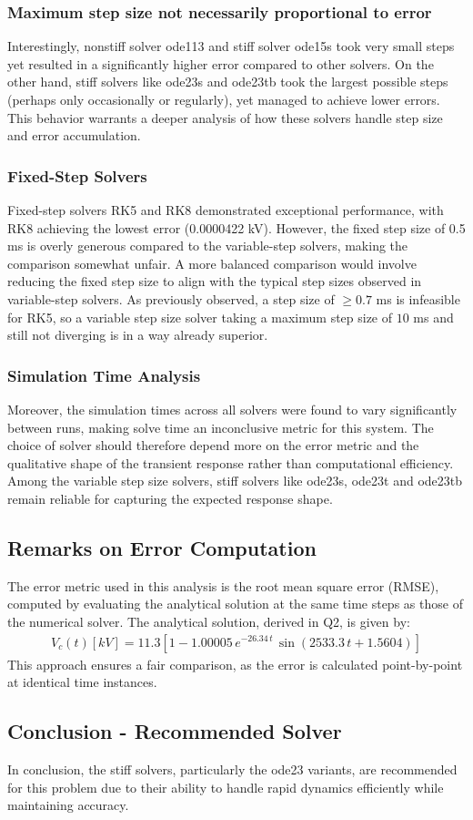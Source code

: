 \subsubsection*{Maximum step size not necessarily proportional to error}
Interestingly, nonstiff solver ode113 and stiff solver ode15s took very small steps yet resulted in a significantly higher error compared to other solvers. On the other hand, stiff solvers like ode23s and ode23tb took the largest possible steps (perhaps only occasionally or regularly), yet managed to achieve lower errors. This behavior warrants a deeper analysis of how these solvers handle step size and error accumulation.

\subsubsection*{Fixed-Step Solvers}
Fixed-step solvers RK5 and RK8 demonstrated exceptional performance, with RK8 achieving the lowest error (0.0000422 kV). However, the fixed step size of 0.5 ms is overly generous compared to the variable-step solvers, making the comparison somewhat unfair. A more balanced comparison would involve reducing the fixed step size to align with the typical step sizes observed in variable-step solvers. As previously observed, a step size of $\geq 0.7$ ms is infeasible for RK5, so a variable step size solver taking a maximum step size of $10$ ms and still not diverging is in a way already superior.

\subsubsection*{Simulation Time Analysis}
Moreover, the simulation times across all solvers were found to vary significantly between runs, making solve time an inconclusive metric for this system. The choice of solver should therefore depend more on the error metric and the qualitative shape of the transient response rather than computational efficiency. Among the variable step size solvers, stiff solvers like ode23s, ode23t and ode23tb remain reliable for capturing the expected response shape.

\subsection*{Remarks on Error Computation}
The error metric used in this analysis is the root mean square error (RMSE), computed by evaluating the analytical solution at the same time steps as those of the numerical solver. The analytical solution, derived in Q2, is given by:
\begin{align*}
    V_{c}(t) [kV] = 11.3 \left[1 - 1.00005 \, e^{-26.34\, t} \, \sin(2533.3\, t + 1.5604)\right]
\end{align*}
This approach ensures a fair comparison, as the error is calculated point-by-point at identical time instances.

\subsection*{Conclusion - Recommended Solver}   

In conclusion, the stiff solvers, particularly the ode23 variants, are recommended for this problem due to their ability to handle rapid dynamics efficiently while maintaining accuracy.
